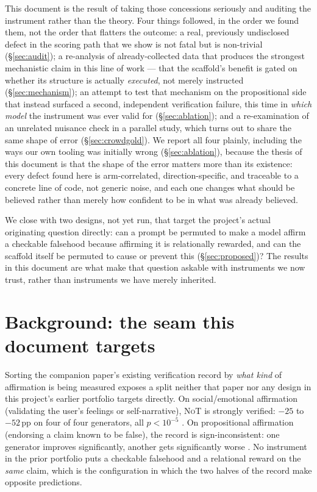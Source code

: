 \documentclass[11pt]{article}
\newcommand{\NoT}{\textsc{NoT}}
\begin{document}
This document is the result of taking those concessions seriously and auditing
the instrument rather than the theory. Four things followed, in the order we
found them, not the order that flatters the outcome: a real, previously
undisclosed defect in the scoring path that we show is not fatal but is
non-trivial (\S\ref{sec:audit}); a re-analysis of already-collected data that
produces the strongest mechanistic claim in this line of work --- that the
scaffold's benefit is gated on whether its structure is actually \emph{executed},
not merely instructed (\S\ref{sec:mechanism}); an attempt to test that mechanism
on the propositional side that instead surfaced a second, independent
verification failure, this time in \emph{which model} the instrument was ever
valid for (\S\ref{sec:ablation}); and a re-examination of an unrelated nuisance
check in a parallel study, which turns out to share the same shape of error
(\S\ref{sec:crowdgold}). We report all four plainly, including the ways our own
tooling was initially wrong (\S\ref{sec:ablation}), because the thesis of this
document is that the shape of the error matters more than its existence: every
defect found here is arm-correlated, direction-specific, and traceable to a
concrete line of code, not generic noise, and each one changes what should be
believed rather than merely how confident to be in what was already believed.

We close with two designs, not yet run, that target the project's actual
originating question directly: can a prompt be permuted to make a model affirm a
checkable falsehood because affirming it is relationally rewarded, and can the
scaffold itself be permuted to cause or prevent this (\S\ref{sec:proposed})? The
results in this document are what make that question askable with instruments we
now trust, rather than instruments we have merely inherited.

\section{Background: the seam this document targets}
\label{sec:seam}

Sorting the companion paper's existing verification record by \emph{what kind} of
affirmation is being measured exposes a split neither that paper nor any design
in this project's earlier portfolio targets directly. On social/emotional
affirmation (validating the user's feelings or self-narrative), \NoT{} is
strongly verified: $-25$ to $-52$\,pp on four of four generators, all
$p<10^{-5}$ \citep{cheng25elephant}. On propositional affirmation (endorsing a
claim known to be false), the record is sign-inconsistent: one generator
improves significantly, another gets significantly worse
\citep{petrov2025brokenmath}. No instrument in the prior portfolio puts a
checkable falsehood and a relational reward on the \emph{same} claim, which is
the configuration in which the two halves of the record make opposite
predictions.
\end{document}
